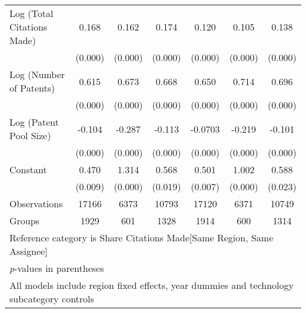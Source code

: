 \begin{table}[htbp]
\begin{adjustbox}{angle=90}
\begin{tabular}{l*{6}{c}}
Log (Total Citations Made)&    0.168&    0.162&    0.174&    0.120&    0.105&    0.138\\
                &  (0.000)&  (0.000)&  (0.000)&  (0.000)&  (0.000)&  (0.000)\\
Log (Number of Patents)&    0.615&    0.673&    0.668&    0.650&    0.714&    0.696\\
                &  (0.000)&  (0.000)&  (0.000)&  (0.000)&  (0.000)&  (0.000)\\
Log (Patent Pool Size)&   -0.104&   -0.287&   -0.113&  -0.0703&   -0.219&   -0.101\\
                &  (0.000)&  (0.000)&  (0.000)&  (0.000)&  (0.000)&  (0.000)\\
Constant        &    0.470&    1.314&    0.568&    0.501&    1.002&    0.588\\
                &  (0.009)&  (0.000)&  (0.019)&  (0.007)&  (0.000)&  (0.023)\\
\hline
Observations    &    17166&     6373&    10793&    17120&     6371&    10749\\
Groups          &     1929&      601&     1328&     1914&      600&     1314\\
\hline\hline
\multicolumn{7}{l}{\footnotesize Reference category is Share Citations Made[Same Region, Same Assignee]}\\
\multicolumn{7}{l}{\footnotesize \textit{p}-values in parentheses}\\
\multicolumn{7}{l}{\footnotesize All models include region fixed effects, year dummies and technology subcategory controls}\\
\end{tabular}
\end{adjustbox}
\end{table}
